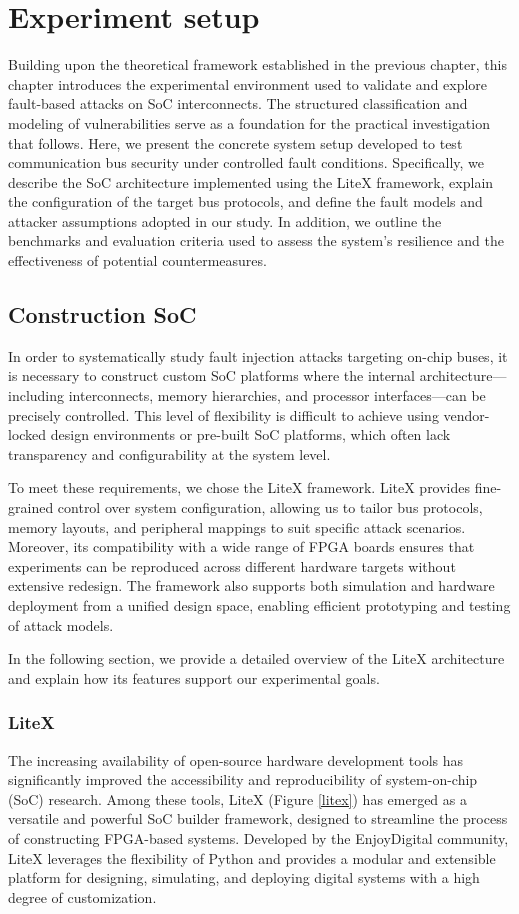 \chapter{Experiment setup}
Building upon the theoretical framework established in the previous chapter, this chapter introduces the experimental environment used to validate and explore fault-based attacks on SoC interconnects. The structured classification and modeling of vulnerabilities serve as a foundation for the practical investigation that follows. Here, we present the concrete system setup developed to test communication bus security under controlled fault conditions. Specifically, we describe the SoC architecture implemented using the LiteX framework, explain the configuration of the target bus protocols, and define the fault models and attacker assumptions adopted in our study. In addition, we outline the benchmarks and evaluation criteria used to assess the system’s resilience and the effectiveness of potential countermeasures.

\section{Construction SoC}
In order to systematically study fault injection attacks targeting on-chip buses, it is necessary to construct custom SoC platforms where the internal architecture—including interconnects, memory hierarchies, and processor interfaces—can be precisely controlled. This level of flexibility is difficult to achieve using vendor-locked design environments or pre-built SoC platforms, which often lack transparency and configurability at the system level.

To meet these requirements, we chose the LiteX framework. LiteX provides fine-grained control over system configuration, allowing us to tailor bus protocols, memory layouts, and peripheral mappings to suit specific attack scenarios. Moreover, its compatibility with a wide range of FPGA boards ensures that experiments can be reproduced across different hardware targets without extensive redesign. The framework also supports both simulation and hardware deployment from a unified design space, enabling efficient prototyping and testing of attack models.

In the following section, we provide a detailed overview of the LiteX architecture and explain how its features support our experimental goals.
\subsection{LiteX}
The increasing availability of open-source hardware development tools has significantly improved the accessibility and reproducibility of system-on-chip (SoC) research. Among these tools, LiteX (Figure \ref{litex}) has emerged as a versatile and powerful SoC builder framework, designed to streamline the process of constructing FPGA-based systems. Developed by the EnjoyDigital community, LiteX leverages the flexibility of Python and provides a modular and extensible platform for designing, simulating, and deploying digital systems with a high degree of customization.

